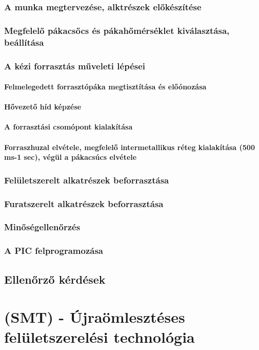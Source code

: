 \documentclass[12pt]{article}
\begin{document}
			\subsubsection{A munka megtervezése, alktrészek előkészítése}

			\subsubsection{Megfelelő pákacsőcs és pákahőmérséklet kiválasztása, beállítása}

			\subsubsection{A kézi forrasztás műveleti lépései}

				\setcounter{secnumdepth}{4}

					\paragraph{Felmelegedett forrasztópáka megtisztítása és előónozása}

					\paragraph{Hővezető híd képzése}

					\paragraph{A forrasztási csomópont kialakítása}

					\paragraph{Forraszhuzal elvétele, megfelelő intermetallikus réteg kialakítása (500 ms-1 sec), végül a pákacsúcs elvétele}

			\subsubsection{Felületszerelt alkatrészek beforrasztása}

			\subsubsection{Furatszerelt alkatrészek beforrasztása}
			
			\subsubsection{Minőségellenőrzés}

			\subsubsection{A PIC felprogramozása}

		\subsection{Ellenőrző kérdések}

	\section{(SMT) - Újraömlesztéses felületszerelési technológia}
\end{document}
